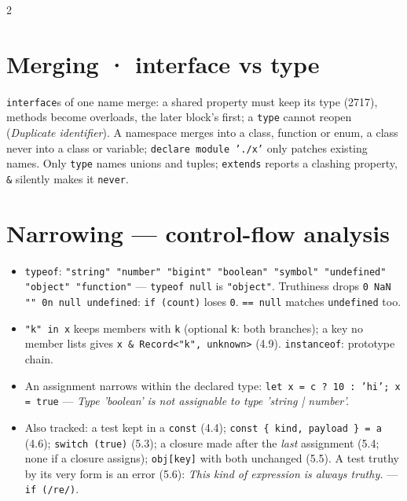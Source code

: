 \documentclass[8pt]{extarticle}
\newcommand\ct[1]{\texttt{#1}}
\newcommand\msg[1]{\textcolor{sheetRed}{\emph{#1}}}
\begin{document}
\begin{multicols}{2}
\section{Merging · interface vs type}
\ct{interface}s of one name merge: a shared property must keep its type (2717), methods become
overloads, the later block's first; a \ct{type} cannot reopen (\msg{Duplicate identifier}). A
namespace merges into a class, function or enum, a class never into a class or variable;
\ct{declare module './x'} only patches existing names. Only \ct{type} names unions and tuples;
\ct{extends} reports a clashing property, \ct{\&} silently makes it \ct{never}.

\columnbreak

\section{Narrowing — control-flow analysis}
\begin{itemize}\raggedright
  \item \ct{typeof}: \ct{"string" "number" "bigint" "boolean" "symbol" "undefined" "object"
        "function"} — \ct{typeof null} is \ct{"object"}. Truthiness drops \ct{0 NaN "" 0n null
        undefined}: \ct{if (count)} loses \ct{0}. \ct{== null} matches \ct{undefined} too.
  \item \ct{"k" in x} keeps members with \ct{k} (optional \ct{k}: both branches); a key no member
        lists gives \ct{x \& Record<"k", unknown>} (4.9). \ct{instanceof}: prototype chain.
  \item An assignment narrows within the declared type: \ct{let x = c ? 10 : 'hi'; x = true} —
        \msg{Type 'boolean' is not assignable to type 'string | number'.}
  \item Also tracked: a test kept in a \ct{const} (4.4); \ct{const \{ kind, payload \} = a}
        (4.6); \ct{switch (true)} (5.3); a closure made after the \emph{last} assignment (5.4;
        none if a closure assigns); \ct{obj[key]} with both unchanged (5.5). A test truthy by
        its very form is an error (5.6): \msg{This kind of expression is always truthy.} —
        \ct{if (/re/)}.
\end{itemize}


\end{multicols}
\end{document}
